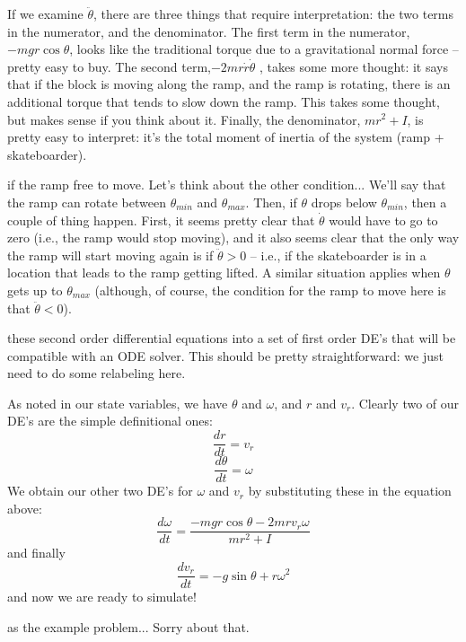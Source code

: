 \documentclass{tufte-handout}
\begin{document}
If we examine $\ddot{\theta}$, there are three things that require interpretation: the two terms in the numerator, and the denominator.  The first term in the numerator, $-mgr\cos\theta$,  looks like the traditional torque due to a gravitational normal force -- pretty easy to buy.  The second term,$- 2mr\dot{r}\dot{\theta}$ , takes some more thought: it says that if the block is moving along the ramp, and the ramp is rotating, there is an additional torque that tends to slow down the ramp.  This takes some thought, but makes sense if you think about it.  Finally, the denominator, $mr^2 + I$, is pretty easy to interpret: it's the total moment of inertia of the system (ramp + skateboarder).

 if the ramp free to move.  Let's think about the other condition...  We'll say that the ramp can rotate between $\theta_{min}$ and $\theta_{max}$.   Then, if $\theta$ drops below $\theta_{min}$, then a couple of thing happen.  First, it seems pretty clear that $\dot{\theta}$ would have to go to zero (i.e., the ramp would stop moving), and it also seems clear that the only way the ramp will start moving again is if $\ddot{\theta}>0$ -- i.e., if the skateboarder is in a location that leads to the ramp getting lifted.  A similar situation applies when $\theta$ gets up to $\theta_{max}$ (although, of course, the condition for the ramp to move here is that $\ddot{\theta}<0$).


 these second order differential equations into a set of first order DE's that will be compatible with an ODE solver. This should be pretty straightforward: we just need to do some relabeling here.

As noted in our state variables, we have $\theta$ and $\omega$, and $r$ and $v_r$.  Clearly two of our DE's are the simple definitional ones:
$$\frac{dr}{dt} = v_r$$
$$\frac{d\theta}{dt} = \omega$$
We obtain our other two DE's for $\omega$ and $v_r$ by substituting these in the equation above:
$$\frac{d\omega}{dt} = \frac{-mgr\cos\theta - 2mr v_r \omega}{mr^2 + I}$$
and finally 
$$\frac{dv_r}{dt} = -g \sin \theta + r\omega^2$$
and now we are ready to simulate!  

 as the example problem... Sorry about that.
\end{document}
